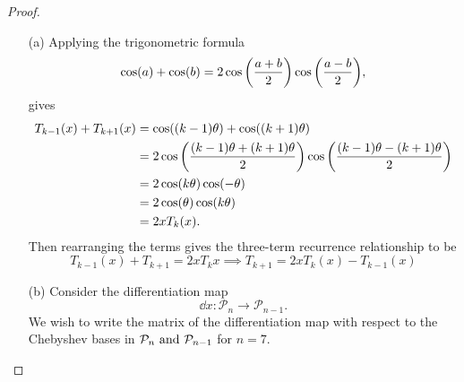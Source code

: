 \documentclass[12pt]{report}
\begin{document}
\begin{problem}
\begin{proof}
\begin{enumerate}
    \item [(a)]
    Applying the trigonometric formula
    \[
        \cos(a) + \cos(b) = 2 \cos {\left(\frac{a+b}{2}\right)}\cos{\left(\frac{a-b}{2}\right)},
    \]
    gives
    \begin{align*}
        T_{k-1}(x) + T_{k+1}(x) &= \cos((k-1)\theta) + \cos((k+1)\theta)\\
        &= 2 \cos {\left( \frac{(k-1)\theta + (k+1)\theta}{2}\right)}\cos{\left(\frac{(k-1)\theta - (k+1)\theta}{2}\right)}\\
        &= 2 \cos (k\theta) \cos(-\theta)\\
        &= 2 \cos(\theta) \cos(k\theta)\\
        &= 2 x T_k(x).
    \end{align*}
    Then rearranging the terms gives the three-term recurrence relationship to be
    \[
        T_{k-1}(x) + T_{k+1} = 2x T_k x \implies T_{k+1} = 2xT_k(x) - T_{k-1}(x)
    \]

    \item [(b)]
    Consider the differentiation map
    \[
        \dd{}{x}: \mathcal{P}_n \to \mathcal{P}_{n-1}.
    \]
    We wish to write the matrix of the differentiation map with respect to the Chebyshev bases in $\mathcal{P}_n {~\text{and}~} \mathcal{P}_{n-1}$ for $n = 7$.


\end{enumerate}
\end{proof}
\end{problem}
\end{document}
